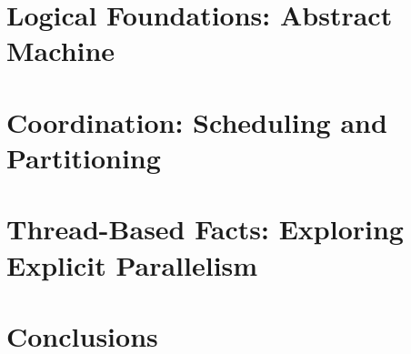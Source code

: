 \documentclass[12pt]{cmuthesis}
\theoremstyle{indented}
\begin{document}
\chapter{Logical Foundations: Abstract Machine}



\chapter{Coordination: Scheduling and Partitioning}\label{chapter:coordination}


\chapter{Thread-Based Facts: Exploring Explicit Parallelism}



\chapter{Conclusions}


\appendix


\backmatter


\renewcommand{\bibsection}{\chapter{\bibname}}

\end{document}
